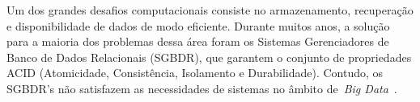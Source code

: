\documentclass[12pt]{article}
\begin{document}
Um dos grandes desafios computacionais consiste no armazenamento, recuperação e disponibilidade de dados de modo eficiente. Durante muitos anos, a solução para a maioria dos problemas dessa área foram os Sistemas Gerenciadores de Banco de Dados Relacionais (SGBDR), que garantem o conjunto de propriedades ACID (Atomicidade, Consistência, Isolamento e Durabilidade). 
Contudo, os SGBDR’s não satisfazem as necessidades de sistemas no âmbito de~\emph{Big Data}~\cite{brito2010bancos}.
\end{document}
